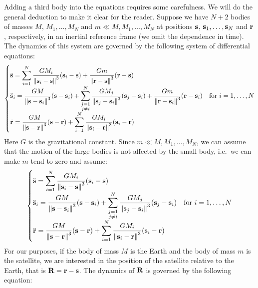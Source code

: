 \documentclass[../main.tex]{subfiles}
\begin{document}
Adding a third body into the equations requires some carefulness. We will do the general deduction to make it clear for the reader. Suppose we have $N+2$ bodies of masses $M$, $M_1,\ldots, M_N$ and $m\ll M,M_1,\ldots,M_N$ at positions $\vf{s}$, $\vf{s}_1,\ldots,\vf{s}_N$ and $\vf{r}$, respectively, in an inertial reference frame (we omit the dependence in time). The dynamics of this system are governed by the following system of differential equations:
\begin{equation}
  \begin{cases}
    \displaystyle \ddot{\vf{s}}=\sum_{i=1}^N\frac{GM_i}{\norm{\vf{s}_i-\vf{s}}^3}(\vf{s}_i-\vf{s})      +\frac{Gm}{\norm{\vf{r}-\vf{s}}^3}(\vf{r}-\vf{s}) \\
    \displaystyle \ddot{\vf{s}}_i=\frac{GM}{\norm{\vf{s}-\vf{s}_i}^3}(\vf{s}-\vf{s}_i)+\sum_{\substack{j=1                                                \\j\ne i}}^N\frac{GM_j}{\norm{\vf{s}_j-\vf{s}_i}^3}(\vf{s}_j-\vf{s}_i)+\frac{Gm}{\norm{\vf{r}-\vf{s}_i}^3}(\vf{r}-\vf{s}_i)& \text{for } i=1,\ldots, N \\
    \displaystyle \ddot{\vf{r}}=\frac{GM}{\norm{\vf{s}-\vf{r}}^3}(\vf{s}-\vf{r})+\sum_{i=1}^N\frac{GM_i}{\norm{\vf{s}_i-\vf{r}}^3}(\vf{s}_i-\vf{r})
  \end{cases}
\end{equation}
Here $G$ is the gravitational constant. Since $m\ll M,M_1,\ldots,M_N$, we can assume that the motion of the large bodies is not affected by the small body, i.e.\ we can make $m$ tend to zero and assume:
\begin{equation}
  \begin{cases}
    \displaystyle \ddot{\vf{s}}= \sum_{i=1}^N\frac{GM_i}{\norm{\vf{s}_i-\vf{s}}^3}(\vf{s}_i-\vf{s})        \\
    \displaystyle \ddot{\vf{s}}_i=\frac{GM}{\norm{\vf{s}-\vf{s}_i}^3}(\vf{s}-\vf{s}_i)+\sum_{\substack{j=1 \\j\ne i}}^N\frac{GM_j}{\norm{\vf{s}_j-\vf{s}_i}^3}(\vf{s}_j-\vf{s}_i)& \text{for } i=1,\ldots, N \\
    \displaystyle \ddot{\vf{r}}=\frac{GM}{\norm{\vf{s}-\vf{r}}^3}(\vf{s}-\vf{r})+\sum_{i=1}^N\frac{GM_i}{\norm{\vf{s}_i-\vf{r}}^3}(\vf{s}_i-\vf{r})
  \end{cases}
\end{equation}
For our purposes, if the body of mass $M$ is the Earth and the body of mass $m$ is the satellite, we are interested in the position of the satellite relative to the Earth, that is $\vf{R}=\vf{r}-\vf{s}$. The dynamics of $\vf{R}$ is governed by the following equation:
\end{document}
